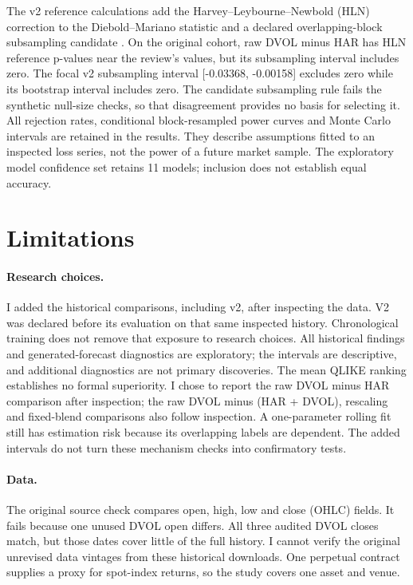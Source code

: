 \documentclass[10pt,a4paper]{article}
\newcommand{\VTwoSubLower}{-0.03368}
\newcommand{\VTwoSubUpper}{-0.00158}
\newcommand{\VTwoMCSSize}{11}
\begin{document}
The v2 reference calculations add the Harvey--Leybourne--Newbold (HLN) correction to the Diebold--Mariano statistic \citep{hln} and a declared overlapping-block subsampling candidate \citep{subsampling}. On the original cohort, raw DVOL minus HAR has HLN reference p-values near the review's values, but its subsampling interval includes zero. The focal v2 subsampling interval [\VTwoSubLower{}, \VTwoSubUpper{}] excludes zero while its bootstrap interval includes zero. The candidate subsampling rule fails the synthetic null-size checks, so that disagreement provides no basis for selecting it. All rejection rates, conditional block-resampled power curves and Monte Carlo intervals are retained in the results. They describe assumptions fitted to an inspected loss series, not the power of a future market sample. The exploratory model confidence set \citep{mcs} retains \VTwoMCSSize{} models; inclusion does not establish equal accuracy.

\section{Limitations}

\paragraph{Research choices.} I added the historical comparisons, including v2, after inspecting the data. V2 was declared before its evaluation on that same inspected history. Chronological training does not remove that exposure to research choices. All historical findings and generated-forecast diagnostics are exploratory; the intervals are descriptive, and additional diagnostics are not primary discoveries. The mean QLIKE ranking establishes no formal superiority. I chose to report the raw DVOL minus HAR comparison after inspection; the raw DVOL minus (HAR + DVOL), rescaling and fixed-blend comparisons also follow inspection. A one-parameter rolling fit still has estimation risk because its overlapping labels are dependent. The added intervals do not turn these mechanism checks into confirmatory tests.

\paragraph{Data.} The original source check compares open, high, low and close (OHLC) fields. It fails because one unused DVOL open differs. All three audited DVOL closes match, but those dates cover little of the full history. I cannot verify the original unrevised data vintages from these historical downloads. One perpetual contract supplies a proxy for spot-index returns, so the study covers one asset and venue.
\end{document}
